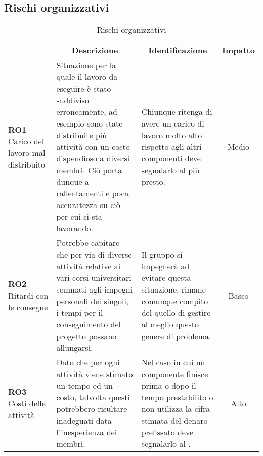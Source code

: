 \subsection{Rischi organizzativi} \label{subsection:rischi_organizzativi}
\begin{table}[H]
    \centering
    \renewcommand{\arraystretch}{1.8}
    \begin{tabular}{p{5.5cm}|p{5cm}|p{5cm}|c}
        \rowcolor[HTML]{1F85DE}
        \multicolumn{1}{c}{\color[HTML]{FFFFFF}\textbf{Codice}}
        & \multicolumn{1}{c}{\color[HTML]{FFFFFF}\textbf{Descrizione}}
        & \multicolumn{1}{c}{\color[HTML]{FFFFFF}\textbf{Identificazione}}
        & \color[HTML]{FFFFFF}\textbf{Impatto}\\
        \hline
        \textbf{RO1} - Carico del lavoro mal distribuito & Situazione per la quale il lavoro da eseguire è stato suddiviso erroneamente, ad esempio sono state distribuite più attività con un costo dispendioso a diversi membri. Ciò porta dunque a rallentamenti e poca accuratezza su ciò per cui si sta lavorando. & Chiunque ritenga di avere un carico di lavoro molto alto rispetto agli altri componenti deve segnalarlo al più presto. & Medio \\
        \textbf{RO2} - Ritardi con le consegne & Potrebbe capitare che per via di diverse attività relative ai vari corsi universitari sommati agli impegni personali dei singoli, i tempi per il conseguimento del progetto possano allungarsi. & Il gruppo si impegnerà ad evitare questa situazione, rimane comunque compito del \roleProjectManagerLow{} quello di gestire al meglio questo genere di problema. & Basso \\
        \textbf{RO3} - Costi delle attività & Dato che per ogni attività viene stimato un tempo ed un costo, talvolta questi potrebbero risultare inadeguati data l'inesperienza dei membri. & Nel caso in cui un componente finisce prima o dopo il tempo prestabilito o non utilizza la cifra stimata del denaro prefissato deve segnalarlo al \roleProjectManagerLow{}. & Alto\\
    \end{tabular}
  \caption{Rischi organizzativi}
\end{table}

